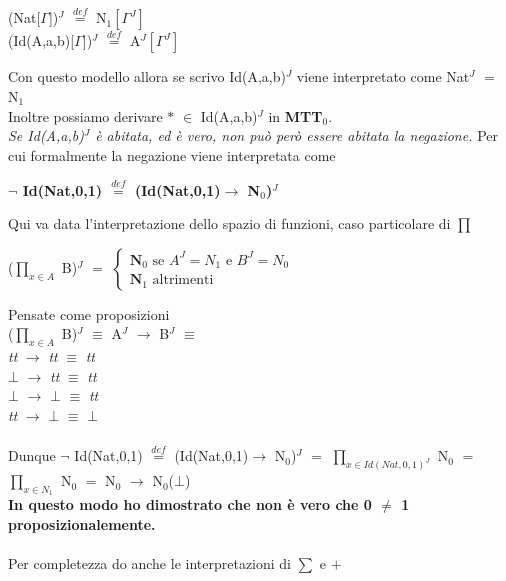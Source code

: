 \begin{enumerate}
\begin{center}
(Nat[$\Gamma$])$^J$ ${\overset{\mathit{def}}{=}}$ N$_1[\Gamma^J]$\\
(Id(A,a,b)[$\Gamma$])$^J$ ${\overset{\mathit{def}}{=}}$ A$^J[\Gamma^J]$
\end{center}
\noindent
Con questo modello allora se scrivo Id(A,a,b)$^J$ viene interpretato come Nat$^J$ $=$ N$_1$\\
Inoltre possiamo derivare $\ast$ $\in$ Id(A,a,b)$^J$ in \textbf{MTT$_0$}.\\
\textit{Se Id(A,a,b)$^J$ \`e abitata, ed \`e vero, non pu\`o per\`o essere abitata la negazione.} Per cui formalmente la negazione viene interpretata come
\begin{center}\textbf{$\neg$ Id(Nat,0,1) ${\overset{\mathit{def}}{=}}$ (Id(Nat,0,1)$\rightarrow$ N$_0$)$^J$ }\end{center}
Qui va data l'interpretazione dello spazio di funzioni, caso particolare di {\scriptsize$\prod$}
\begin{center}
($\prod\limits_{x \in A}$ B)$^J$ $=$
$
\begin{cases}
\textbf{N}_0\text{ se } A^J =  N_1  \text{ e } B^J = N_0\\
\textbf{N}_1 \text{ altrimenti}
\end{cases}
$
\end{center}
\noindent
Pensate come proposizioni \\
($\prod\limits_{x \in A}$ B)$^J$ $\equiv$ A$^J$ $\rightarrow$ B$^J$ $\equiv$\\
\textit{tt} $\rightarrow$ \textit{tt} $\equiv$ \textit{tt}\\
$\bot$ $\rightarrow$ \textit{tt} $\equiv$ \textit{tt}\\
$\bot$ $\rightarrow$ $\bot$ $\equiv$ \textit{tt}\\
\textit{tt} $\rightarrow$ $\bot$ $\equiv$ $\bot$\\\\
\noindent
Dunque $\neg$ Id(Nat,0,1) ${\overset{\mathit{def}}{=}}$ (Id(Nat,0,1)$\rightarrow$ N$_0$)$^J$ $=$ $\prod\limits_{x \in Id(Nat,0,1)^J}$ N$_0$ $=$ $\prod\limits_{x \in N_1}$ N$_0$ $=$ N$_0$ $\rightarrow$ N$_0$($\bot$)\\
\textbf{In questo modo ho dimostrato che non \`e vero che 0 $\neq$ 1 proposizionalemente.}\\\\
\noindent
Per completezza do anche le interpretazioni di  {\scriptsize}$\sum$ e  $+$


\end{enumerate}
